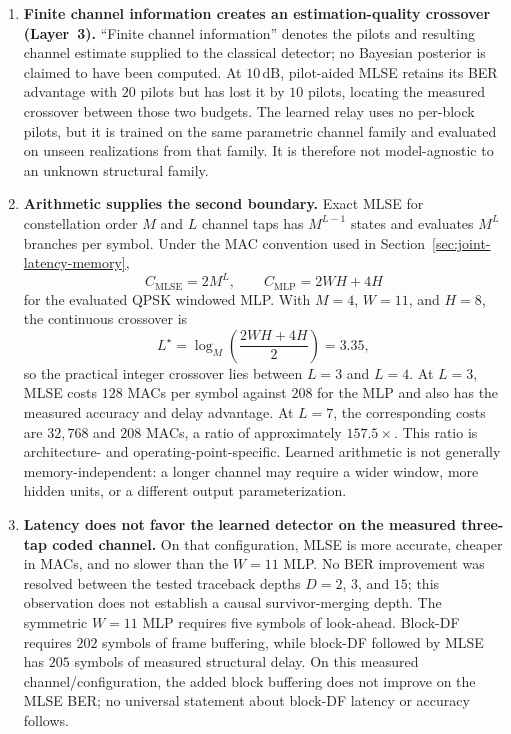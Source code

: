 \begin{enumerate}
    \item \textbf{Finite channel information creates an estimation-quality
    crossover (Layer~3).}
    ``Finite channel information'' denotes the pilots and resulting channel
    estimate supplied to the classical detector; no Bayesian posterior is
    claimed to have been computed.  At \(10\,\mathrm{dB}\), pilot-aided MLSE
    retains its BER advantage with \(20\) pilots but has lost it by
    \(10\) pilots, locating the measured crossover between those two budgets.
    The learned relay uses no per-block pilots, but it is trained on the same
    parametric channel family and evaluated on unseen realizations from that
    family.  It is therefore not model-agnostic to an unknown structural
    family.

    \item \textbf{Arithmetic supplies the second boundary.}
    Exact MLSE for constellation order \(M\) and \(L\) channel taps has
    \(M^{L-1}\) states and evaluates \(M^L\) branches per symbol.  Under the
    MAC convention used in Section~\ref{sec:joint-latency-memory},
    \[
        C_{\mathrm{MLSE}} = 2M^L,
        \qquad
        C_{\mathrm{MLP}} = 2WH + 4H
    \]
    for the evaluated QPSK windowed MLP.  With \(M=4\), \(W=11\), and
    \(H=8\), the continuous crossover is
    \[
        L^\star
        = \log_M\!\left(\frac{2WH+4H}{2}\right)
        = 3.35,
    \]
    so the practical integer crossover lies between \(L=3\) and \(L=4\).
    At \(L=3\), MLSE costs \(128\) MACs per symbol against \(208\) for the
    MLP and also has the measured accuracy and delay advantage.  At \(L=7\),
    the corresponding costs are \(32{,}768\) and \(208\) MACs, a ratio of
    approximately \(157.5\times\).  This ratio is architecture- and
    operating-point-specific.  Learned arithmetic is not generally
    memory-independent: a longer channel may require a wider window, more
    hidden units, or a different output parameterization.

    \item \textbf{Latency does not favor the learned detector on the measured
    three-tap coded channel.}
    On that configuration, MLSE is more accurate, cheaper in MACs, and no
    slower than the \(W=11\) MLP.  No BER improvement was resolved between
    the tested traceback depths \(D=2\), \(3\), and \(15\); this observation
    does not establish a causal survivor-merging depth.  The symmetric
    \(W=11\) MLP requires five symbols of look-ahead.  Block-DF requires
    \(202\) symbols of frame buffering, while block-DF followed by MLSE has
    \(205\) symbols of measured structural delay.  On this measured
    channel/configuration, the added block buffering does not improve on the
    MLSE BER; no universal statement about block-DF latency or accuracy
    follows.
\end{enumerate}

